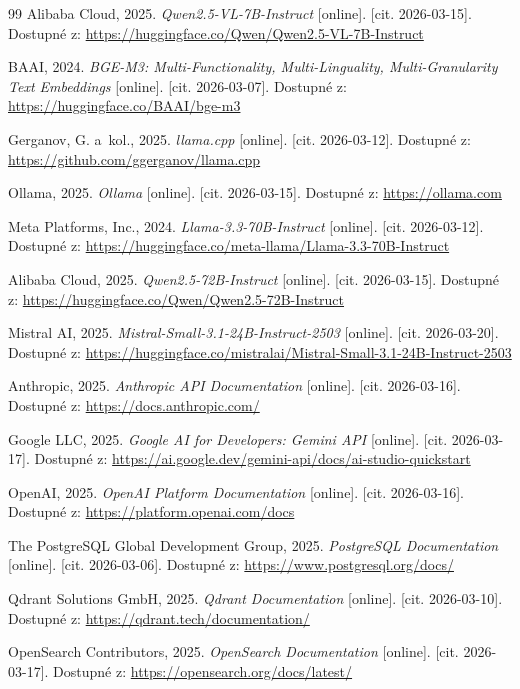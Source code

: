 \documentclass[a4paper, 11pt]{article}
\newcommand{\docurl}[1]{\textcolor{cblue}{\url{#1}}}
\begin{document}
\begin{thebibliography}{99}
 Alibaba Cloud, 2025. \textit{Qwen2.5-VL-7B-Instruct} [online]. [cit. 2026-03-15]. Dostupné z: \docurl{https://huggingface.co/Qwen/Qwen2.5-VL-7B-Instruct}

 BAAI, 2024. \textit{BGE-M3: Multi-Functionality, Multi-Linguality, Multi-Granularity Text Embeddings} [online]. [cit. 2026-03-07]. Dostupné z: \docurl{https://huggingface.co/BAAI/bge-m3}

 Gerganov, G. a~kol., 2025. \textit{llama.cpp} [online]. [cit. 2026-03-12]. Dostupné z: \docurl{https://github.com/ggerganov/llama.cpp}

 Ollama, 2025. \textit{Ollama} [online]. [cit. 2026-03-15]. Dostupné z: \docurl{https://ollama.com}

 Meta Platforms, Inc., 2024. \textit{Llama-3.3-70B-Instruct} [online]. [cit. 2026-03-12]. Dostupné z: \docurl{https://huggingface.co/meta-llama/Llama-3.3-70B-Instruct}

 Alibaba Cloud, 2025. \textit{Qwen2.5-72B-Instruct} [online]. [cit. 2026-03-15]. Dostupné z: \docurl{https://huggingface.co/Qwen/Qwen2.5-72B-Instruct}

 Mistral AI, 2025. \textit{Mistral-Small-3.1-24B-Instruct-2503} [online]. [cit. 2026-03-20]. Dostupné z: \docurl{https://huggingface.co/mistralai/Mistral-Small-3.1-24B-Instruct-2503}

 Anthropic, 2025. \textit{Anthropic API Documentation} [online]. [cit. 2026-03-16]. Dostupné z: \docurl{https://docs.anthropic.com/}

 Google LLC, 2025. \textit{Google AI for Developers: Gemini API} [online]. [cit. 2026-03-17]. Dostupné z: \docurl{https://ai.google.dev/gemini-api/docs/ai-studio-quickstart}

 OpenAI, 2025. \textit{OpenAI Platform Documentation} [online]. [cit. 2026-03-16]. Dostupné z: \docurl{https://platform.openai.com/docs}

 The PostgreSQL Global Development Group, 2025. \textit{PostgreSQL Documentation} [online]. [cit. 2026-03-06]. Dostupné z: \docurl{https://www.postgresql.org/docs/}

 Qdrant Solutions GmbH, 2025. \textit{Qdrant Documentation} [online]. [cit. 2026-03-10]. Dostupné z: \docurl{https://qdrant.tech/documentation/}

 OpenSearch Contributors, 2025. \textit{OpenSearch Documentation} [online]. [cit. 2026-03-17]. Dostupné z: \docurl{https://opensearch.org/docs/latest/}


\end{thebibliography}
\end{document}

